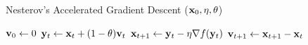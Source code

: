 \begin{algorithm}[t]
\caption{Nesterov's Accelerated Gradient Descent ($\mathbf{x}_0, \eta, \theta$)}\label{algo:AGD}
\begin{algorithmic}[1]
\STATE $\mathbf{v}_0 \leftarrow 0$
\STATE $\mathbf{y}_{t} \leftarrow \mathbf{x}_{t} + (1-\theta) \mathbf{v}_t$
\STATE $\mathbf{x}_{t+1} \leftarrow \mathbf{y}_t - \eta \nabla f (\mathbf{y}_t)$
\STATE $\mathbf{v}_{t+1} \leftarrow \mathbf{x}_{t+1} - \mathbf{x}_t $
\ENDFOR
\end{algorithmic}
\end{algorithm}










